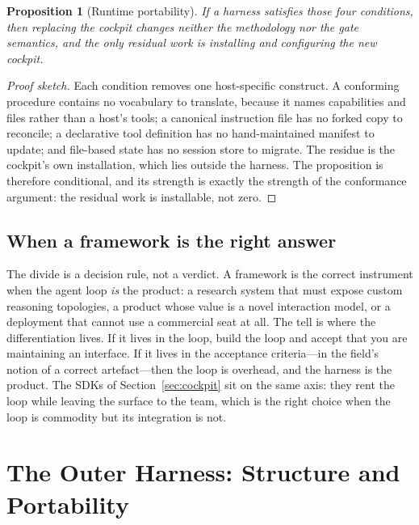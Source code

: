 \documentclass[10pt,a4paper]{article}
\theoremstyle{definition}
\theoremstyle{plain}
\newtheorem{proposition}{Proposition}[section]
\theoremstyle{principle}
\begin{document}
\begin{proposition}[Runtime portability]\label{pr:portability}
If a harness satisfies those four conditions, then replacing the cockpit changes neither the
methodology nor the gate semantics, and the only residual work is installing and configuring the
new cockpit.
\end{proposition}

\begin{proof}[Proof sketch]
Each condition removes one host-specific construct. A conforming procedure contains no vocabulary
to translate, because it names capabilities and files rather than a host's tools; a canonical
instruction file has no forked copy to reconcile; a declarative tool definition has no
hand-maintained manifest to update; and file-based state has no session store to migrate. The
residue is the cockpit's own installation, which lies outside the harness. The proposition is
therefore conditional, and its strength is exactly the strength of the conformance argument: the
residual work is installable, not zero.
\end{proof}

\subsection{When a framework is the right answer}

The divide is a decision rule, not a verdict. A framework is the correct instrument when the
agent loop \emph{is} the product: a research system that must expose custom reasoning topologies,
a product whose value is a novel interaction model, or a deployment that cannot use a commercial
seat at all. The tell is where the differentiation lives. If it lives in the loop, build the loop
and accept that you are maintaining an interface. If it lives in the acceptance criteria---in the
field's notion of a correct artefact---then the loop is overhead, and the harness is the product.
The SDKs of Section~\ref{sec:cockpit} sit on the same axis: they rent the loop while leaving the
surface to the team, which is the right choice when the loop is commodity but its integration is
not.

\section{The Outer Harness: Structure and Portability}\label{sec:outer}
\end{document}
